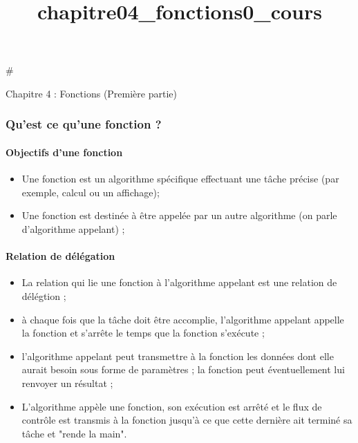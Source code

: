 \documentclass[11pt]{article}
\title{chapitre04\_fonctions0\_cours}
\providecommand{\tightlist}{%
      \setlength{\itemsep}{0pt}\setlength{\parskip}{0pt}}
\begin{document}
    
    
    \maketitle
    
    

    
    \#

Chapitre 4 : Fonctions (Première partie)

    \subsubsection{Qu'est ce qu'une fonction
?}\label{quest-ce-quune-fonction}

    \paragraph{Objectifs d'une fonction}\label{objectifs-dune-fonction}

    \begin{itemize}
\tightlist
\item
  Une fonction est un algorithme spécifique effectuant une tâche précise
  (par exemple, calcul ou un affichage);
\item
  Une fonction est destinée à être appelée par un autre algorithme (on
  parle d'algorithme appelant) ;
\end{itemize}

    \paragraph{Relation de délégation}\label{relation-de-duxe9luxe9gation}

    \begin{itemize}
\tightlist
\item
  La relation qui lie une fonction à l'algorithme appelant est une
  relation de délégtion ;
\item
  à chaque fois que la tâche doit être accomplie, l'algorithme appelant
  appelle la fonction et s'arrête le temps que la fonction s'exécute ;
\item
  l'algorithme appelant peut transmettre à la fonction les données dont
  elle aurait besoin sous forme de paramètres ; la fonction peut
  éventuellement lui renvoyer un résultat ;
\item
  L'algorithme appèle une fonction, son exécution est arrêté et le flux
  de contrôle est transmis à la fonction jusqu'à ce que cette dernière
  ait terminé sa tâche et "rende la main".
\end{itemize}
\end{document}
